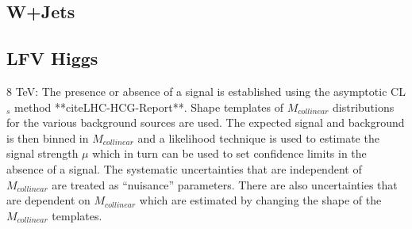 \subsection{W+Jets}
\subsection{LFV Higgs}
8 TeV:
The presence or absence of a signal is established using the asymptotic CL$_{s}$ method **cite{LHC-HCG-Report}**. Shape templates of $M_{collinear}$  
distributions for the various background sources are used. The expected signal and background
is then binned in $M_{collinear}$ and a likelihood technique is used to estimate the signal strength $\mu$ which in turn can be used to
set confidence limits in the absence of a signal.
The systematic uncertainties that are independent of $M_{collinear}$ are treated as  ``nuisance''
parameters. There are also uncertainties that are dependent on $M_{collinear}$ which are estimated by changing the shape of the $M_{collinear}$ templates.



